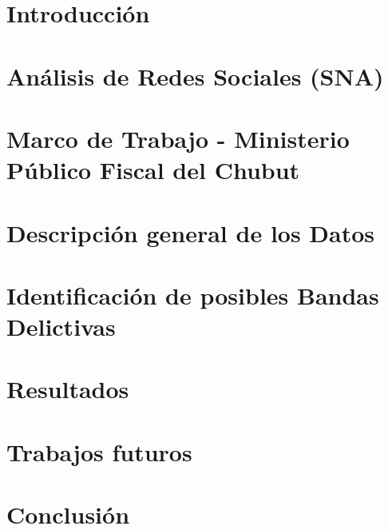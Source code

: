 \documentclass[runningheads]{llncs}
\begin{document}
%

\maketitle              %
%
\begin{abstract}

\end{abstract}
%
%
\section{Introducción}


\section{Análisis de Redes Sociales (SNA)}


\section{Marco de Trabajo - Ministerio Público Fiscal del Chubut}


\section{Descripción general de los Datos}


\section{Identificación de posibles Bandas Delictivas}


\section{Resultados}


\section{Trabajos futuros}


\section{Conclusión}



\end{document}
